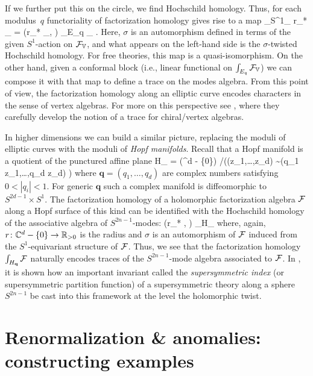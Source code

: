 \documentclass[11pt]{amsart}
\def\C{{\mathbb{C}}}
\renewcommand{\op}{\operatorname}
\begin{document}
If we further put this on the circle, we find Hochschild homology.
Thus, for each modulus~$q$ functoriality of factorization homology gives rise to a map
\beqn
\int_{S^1_{\sigma}} r_* \cF_{} = \op{Hoch}(r_* \cF_{}, \sigma) \to \int_{E_q} \cF_{} .
\eeqn
Here, $\sigma$ is an automorphism defined in terms of the given $S^1$-action on $\mathcal F_{\mathbb{V}}$, and what appears on the left-hand side is the $\sigma$-twisted Hochschild homology.
For free theories, this map is a quasi-isomorphism.
On the other hand, given a conformal block (i.e., linear functional on $\int_{E_q} \mathcal F_{\mathbb{V}}$) we can compose it with that map to define a trace on the modes algebra.
From this point of view, the factorization homology along an elliptic curve encodes characters in the sense of vertex algebras.
For more on this perspective see \cite{GuiLi}, where they carefully develop the notion of a trace for chiral/vertex algebras.

In higher dimensions we can build a similar picture,
replacing the moduli of elliptic curves with the moduli of {\it Hopf manifolds}.
Recall that a Hopf manifold is a quotient of the punctured affine plane
\beqn
H_{} = \left(\C^d - \{0\}\right) \slash \left((z_1,\ldots,z_d) \sim (q_1 z_1,\ldots,q_d z_d) \right)
\eeqn
where $\mathbf{q} = (q_1,\ldots,q_d)$ are complex numbers satisfying $0 < |q_i| < 1$.
For generic $\mathbf{q}$ such a complex manifold is diffeomorphic to $S^{2d-1} \times S^1$.
The factorization homology of a holomorphic factorization algebra $\mathcal F$ along a Hopf surface of this kind can be identified with the Hochschild homology of the associative algebra of $S^{2n-1}$-modes:
\beqn
\op{Hoch}(r_* \cF , \sigma) \to \int_{H_{}} \cF 
\eeqn
where, again, $r\colon \C^d - \{0\} \to \RR_{>0}$ is the radius and $\sigma$ is an automorphism of $\mathcal F$ induced from the $S^1$-equivariant structure of $\mathcal F$.
Thus, we see that the factorization homology $\int_{H_{\mathbf{q}}} \mathcal F$ naturally encodes traces of the $S^{2n-1}$-mode algebra associated to $\mathcal F$.
In \cite{SWchar}, it is shown how an important invariant called the \textit{supersymmetric index} (or supersymmetric partition function) of a supersymmetric theory along a sphere $S^{2n-1}$ be cast into this framework at the level the holomorphic twist.

\section{Renormalization \& anomalies: constructing examples}
\label{sec: renorm}
\end{document}
